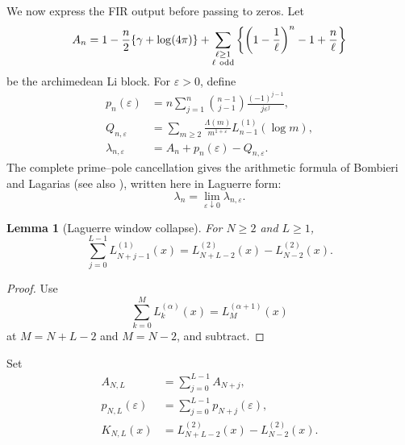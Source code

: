 \documentclass[11pt]{amsart}
\numberwithin{equation}{section}
\newtheorem{lemma}[theorem]{Lemma}
\theoremstyle{definition}
\theoremstyle{remark}
\newcommand{\eps}{\varepsilon}
\begin{document}
We now express the FIR output before passing to zeros. Let
\begin{equation}
 A_n
 =1-\frac n2\{\gamma+\log(4\pi)\}
  +\sum_{\substack{\ell\ge1\\ \ell\ {\rm odd}}}
   \left\{\left(1-\frac1\ell\right)^n-1+\frac n\ell\right\}
                                                        \label{eq:6.1}
\end{equation}
be the archimedean Li block. For \(\eps>0\), define
\begin{equation}
\begin{aligned}
 p_n(\eps)
 &=n\sum_{j=1}^n\binom{n-1}{j-1}
       \frac{(-1)^{j-1}}{j\eps^j},\\
 Q_{n,\eps}
 &=\sum_{m\ge2}\frac{\Lambda(m)}{m^{1+\eps}}
       L_{n-1}^{(1)}(\log m),\\
 \lambda_{n,\eps}
 &=A_n+p_n(\eps)-Q_{n,\eps}.
\end{aligned}                                            \label{eq:6.2}
\end{equation}
The complete prime--pole cancellation gives the arithmetic formula of
Bombieri and Lagarias \cite[Thm.~2]{BombieriLagarias} (see also
\cite{Lagarias,Coffey}), written here in Laguerre form:
\begin{equation}
 \lambda_n=\lim_{\eps\downarrow0}\lambda_{n,\eps}.
                                                        \label{eq:6.3}
\end{equation}

\begin{lemma}[Laguerre window collapse]
\label{lem:lag-window}
For \(N\ge2\) and \(L\ge1\),
\begin{equation}
 \sum_{j=0}^{L-1}L_{N+j-1}^{(1)}(x)
 =L_{N+L-2}^{(2)}(x)-L_{N-2}^{(2)}(x).                  \label{eq:6.4}
\end{equation}
\end{lemma}

\begin{proof}
Use \cite[(5.1.13)]{Szego}
\[
 \sum_{k=0}^{M}L_k^{(\alpha)}(x)=L_M^{(\alpha+1)}(x)
\]
at \(M=N+L-2\) and \(M=N-2\), and subtract.
\end{proof}

Set
\begin{equation}
\begin{aligned}
 A_{N,L}&=\sum_{j=0}^{L-1}A_{N+j},\\
 p_{N,L}(\eps)&=\sum_{j=0}^{L-1}p_{N+j}(\eps),\\
 K_{N,L}(x)&=L_{N+L-2}^{(2)}(x)-L_{N-2}^{(2)}(x).
\end{aligned}                                            \label{eq:6.5}
\end{equation}
\end{document}
